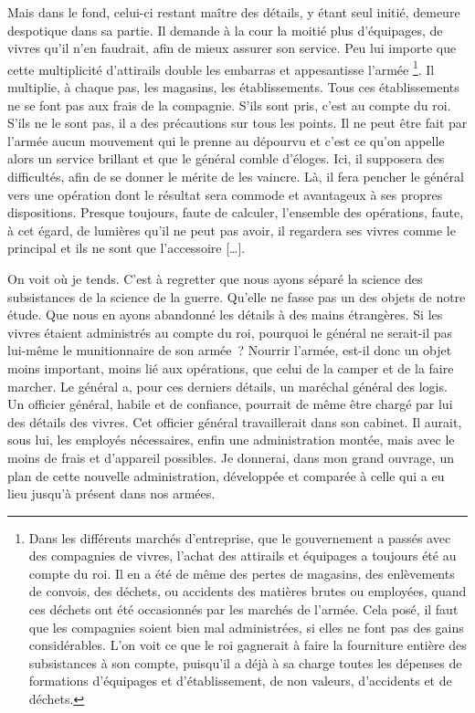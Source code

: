 \documentclass[french,twoside]{book} %
\begin{document}
Mais dans le fond, celui-ci restant maître des détails, y étant seul initié, demeure despotique dans sa partie. Il demande à la cour la moitié plus d’équipages, de vivres qu’il n’en faudrait, afin de mieux assurer son service. Peu lui importe que cette multiplicité d’attirails double les embarras et appesantisse l’armée
\label{footnote9}\footnote{Dans les différents marchés d’entreprise, que le gouvernement a passés avec des compagnies de vivres, l’achat des attirails et équipages a toujours été au compte du roi. Il en a été de même des pertes de magasins, des enlèvements de convois, des déchets, ou accidents des matières brutes ou employées, quand ces déchets ont été occasionnés par les marchés de l’armée. Cela posé, il faut que les compagnies soient bien mal administrées, si elles ne font pas des gains considérables. L’on voit ce que le roi gagnerait à faire la fourniture entière des subsistances à son compte, puisqu’il a déjà à sa charge toutes les dépenses de formations d’équipages et d’établissement, de non valeurs, d’accidents et de déchets.}. Il multiplie, à chaque pas, les magasins, les établissements. Tous ces établissements ne se font pas aux frais de la compagnie. S’ils sont pris, c’est au compte du roi. S’ils ne le sont pas, il a des précautions sur tous les points. Il ne peut être fait par l’armée aucun mouvement qui le prenne au dépourvu et c’est ce qu’on appelle alors un service brillant et que le général comble d’éloges. Ici, il supposera des difficultés, afin de se donner le mérite de les vaincre. Là, il fera pencher le général vers une opération dont le résultat sera commode et avantageux à ses propres dispositions. Presque toujours, faute de calculer, l’ensemble des opérations, faute, à cet égard, de lumières qu’il ne peut pas avoir, il regardera ses vivres comme le principal et ils ne sont que l’accessoire […].\par
On voit où je tends. C’est à regretter que nous ayons séparé la science des subsistances de la science de la guerre. Qu’elle ne fasse pas un des objets de notre étude. Que nous en ayons abandonné les détails à des mains étrangères. Si les vivres étaient administrés au compte du roi, pourquoi le général ne serait-il pas lui-même le munitionnaire de son armée ? Nourrir l’armée, est-il donc un objet moins important, moins lié aux opérations, que celui de la camper et de la faire marcher. Le général a, pour ces derniers détails, un maréchal général des logis. Un officier général, habile et de confiance, pourrait de même être chargé par lui des détails des vivres. Cet officier général travaillerait dans son cabinet. Il aurait, sous lui, les employés nécessaires, enfin une administration montée, mais avec le moins de frais et d’appareil possibles. Je donnerai, dans mon grand ouvrage, un plan de cette nouvelle administration, développée et comparée à celle qui a eu lieu jusqu’à présent dans nos armées.\par
\end{document}
